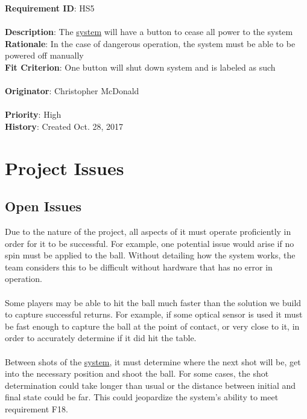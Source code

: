 \documentclass[11pt]{article}
\begin{document}
\begin{framed}
	\noindent\textbf{Requirement ID}: HS5 \hfill\\\\
	\noindent\textbf{Description}: The \hyperref[sec:definitions]{system} will have a button to cease all power to the system \\
	\textbf{Rationale}: In the case of dangerous operation, the system must be able to be powered off manually \\
	\textbf{Fit Criterion}: One button will shut down system and is labeled as such \\\\
	\textbf{Originator}: Christopher McDonald \\\\
	\textbf{Priority}: High \hfill \\
	\noindent\textbf{History}: Created Oct. 28, 2017
\end{framed}

\section{Project Issues}
\subsection{Open Issues}
Due to the nature of the project, all aspects of it must operate proficiently in order for it to be successful. For example, one potential issue would arise if no spin must be applied to the ball. Without detailing how the system works, the team considers this to be difficult without hardware that has no error in operation. \\\\
Some players may be able to hit the ball much faster than the solution we build to capture successful returns. For example, if some optical sensor is used it must be fast enough to capture the ball at the point of contact, or very close to it, in order to accurately determine if it did hit the table. \\\\
Between shots of the \hyperref[sec:definitions]{system}, it must determine where the next shot will be, get into the necessary position and shoot the ball. For some cases, the shot determination could take longer than usual or the distance between initial and final state could be far. This could jeopardize the system's ability to meet requirement F18.
\end{document}
